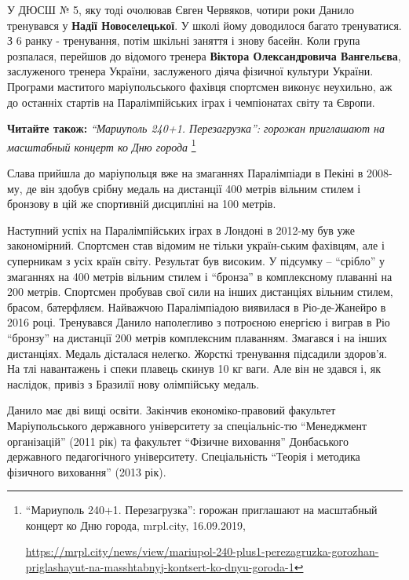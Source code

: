 
У ДЮСШ № 5, яку тоді очолював Євген Червяков, чотири роки Данило тренувався у
\textbf{Надії Новоселецької}. У школі йому доводилося багато тренуватися. З 6 ранку -
тренування, потім шкільні заняття і знову басейн. Коли група розпалася,
перейшов до відомого тренера \textbf{Віктора Олександровича Вангельєва}, заслуженого
тренера України, заслуженого діяча фізичної культури України. Програми
маститого маріупольського фахівця спортсмен виконує неухильно, аж до останніх
стартів на Паралімпійських іграх і чемпіонатах світу та Європи.

\textbf{Читайте також:} \emph{\enquote{Мариуполь 240+1. Перезагрузка}: горожан приглашают на масштабный концерт ко Дню города}%
\footnote{\enquote{Мариуполь 240+1. Перезагрузка}: горожан приглашают на масштабный концерт ко Дню города, mrpl.city, 16.09.2019, \par%
\url{https://mrpl.city/news/view/mariupol-240-plus1-perezagruzka-gorozhan-priglashayut-na-masshtabnyj-kontsert-ko-dnyu-goroda-1}
}

Слава прийшла до маріупольця вже на змаганнях Паралімпіади в Пекіні в 2008-му,
де він здобув срібну медаль на дистанції 400 метрів вільним стилем і бронзову в
цій же спортивній дисципліні на 100 метрів.

Наступний успіх на Паралімпійських іграх в Лондоні в 2012-му був уже
закономірний. Спортсмен став відомим не тільки україн\hyp{}ським фахівцям, але і
суперникам з усіх країн світу. Результат був високим. У підсумку – \enquote{срібло} у
змаганнях на 400 метрів вільним стилем і \enquote{бронза} в комплексному плаванні на
200 метрів. Спортсмен пробував свої сили на інших дистанціях вільним стилем,
брасом, батерфляєм. Найважчою Паралімпіадою виявилася в Ріо-де-Жанейро в 2016
році. Тренувався Данило наполегливо з потроєною енергією і виграв в Ріо
\enquote{бронзу} на дистанції 200 метрів комплексним плаванням. Змагався і на інших
дистанціях. Медаль дісталася нелегко. Жорсткі тренування підсадили здоров'я. На
тлі навантажень і спеки плавець скинув 10 кг ваги. Але він не здався і, як
наслідок, привіз з Бразилії нову олімпійську медаль.

Данило має дві вищі освіти. Закінчив економіко-правовий факультет
Маріупольського державного університету за спеціальніс\hyp{}тю \enquote{Менеджмент
організацій} (2011 рік) та факультет \enquote{Фізичне виховання} Донбаського державного
педагогічного університету. Спеціальність \enquote{Теорія і методика фізичного
виховання} (2013 рік).

